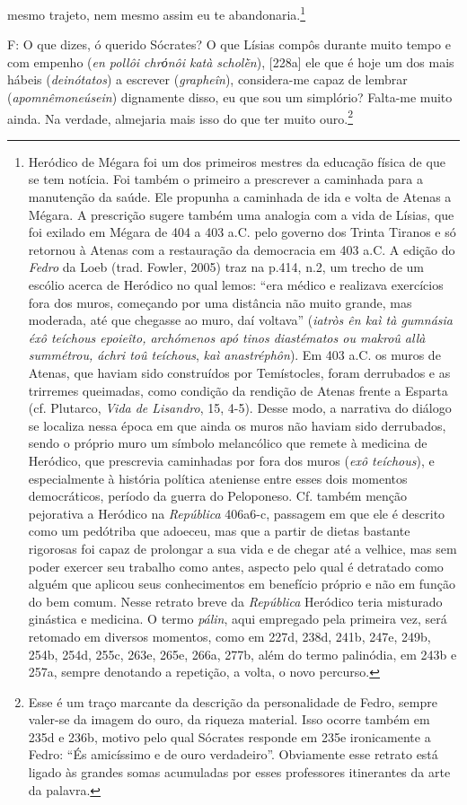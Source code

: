 mesmo trajeto, nem mesmo assim eu te abandonaria.\footnote{Heródico de
  Mégara foi um dos primeiros mestres da educação física de que se tem
  notícia. Foi também o primeiro a prescrever a caminhada para a
  manutenção da saúde. Ele propunha a caminhada de ida e volta de Atenas
  a Mégara. A prescrição sugere também uma analogia com a vida de
  Lísias, que foi exilado em Mégara de 404 a 403 a.C. pelo governo dos
  Trinta Tiranos e só retornou à Atenas com a restauração da democracia
  em 403 a.C. A edição do \emph{Fedro} da Loeb (trad. Fowler, 2005) traz
  na p.414, n.2, um trecho de um escólio acerca de Heródico no qual
  lemos: ``era médico e realizava exercícios fora dos muros, começando
  por uma distância não muito grande, mas moderada, até que chegasse ao
  muro, daí voltava'' (\emph{iatròs ên kaì tà gumnásia éxô teíchous
  epoieîto, archómenos apó tinos diastématos ou makroû allà summétrou,
  áchri toû teíchous}, \emph{kaì anastréphôn}). Em 403 a.C. os muros de
  Atenas, que haviam sido construídos por Temístocles, foram derrubados
  e as trirremes queimadas, como condição da rendição de Atenas frente a
  Esparta (cf. Plutarco, \emph{Vida de Lisandro}, 15, 4-5). Desse modo,
  a narrativa do diálogo se localiza nessa época em que ainda os muros
  não haviam sido derrubados, sendo o próprio muro um símbolo
  melancólico que remete à medicina de Heródico, que prescrevia
  caminhadas por fora dos muros (\emph{exô teíchous}), e especialmente à
  história política ateniense entre esses dois momentos democráticos,
  período da guerra do Peloponeso. Cf. também menção pejorativa a
  Heródico na \emph{República} 406a6-c, passagem em que ele é descrito
  como um pedótriba que adoeceu, mas que a partir de dietas bastante
  rigorosas foi capaz de prolongar a sua vida e de chegar até a velhice,
  mas sem poder exercer seu trabalho como antes, aspecto pelo qual é
  detratado como alguém que aplicou seus conhecimentos em benefício
  próprio e não em função do bem comum. Nesse retrato breve da
  \emph{República} Heródico teria misturado ginástica e medicina. O
  termo \emph{pálin}, aqui empregado pela primeira vez, será retomado em
  diversos momentos, como em 227d, 238d, 241b, 247e, 249b, 254b, 254d,
  255c, 263e, 265e, 266a, 277b, além do termo palinódia, em 243b e 257a,
  sempre denotando a repetição, a volta, o novo percurso.}

F: O que dizes, ó querido Sócrates? O que Lísias compôs durante muito
tempo e com empenho (\emph{en pollôi chrόnôi katà scholḕn}), {[}228a{]}
ele que é hoje um dos mais hábeis (\emph{deinótatos}) a escrever
(\emph{grapheîn}), considera-me capaz de lembrar
(\emph{apomnêmoneúsein}) dignamente disso, eu que sou um simplório?
Falta-me muito ainda. Na verdade, almejaria mais isso do que ter muito
ouro.\footnote{Esse é um traço marcante da descrição da personalidade de
  Fedro, sempre valer-se da imagem do ouro, da riqueza material. Isso
  ocorre também em 235d e 236b, motivo pelo qual Sócrates responde em
  235e ironicamente a Fedro: ``És amicíssimo e de ouro verdadeiro''.
  Obviamente esse retrato está ligado às grandes somas acumuladas por
  esses professores itinerantes da arte da palavra.}


